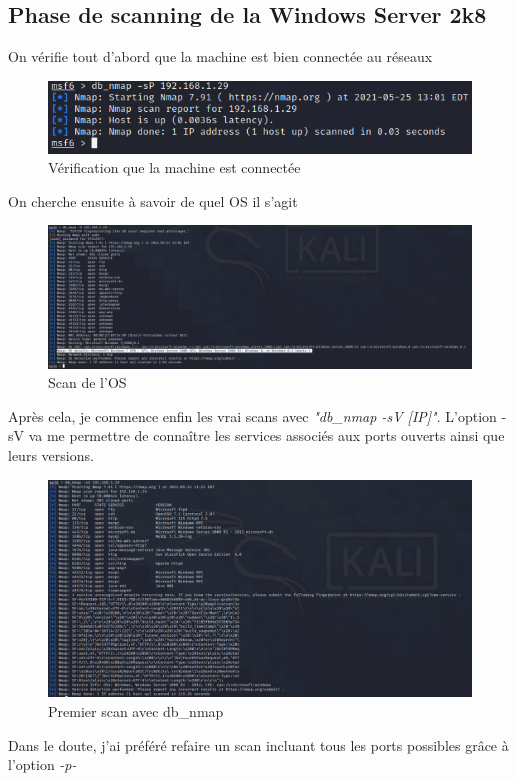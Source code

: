 \documentclass[a4paper]{article}
\begin{document}
\subsection{Phase de scanning de la Windows Server 2k8}
On vérifie tout d'abord que la machine est bien connectée au réseaux
\begin{figure}[H]
  \centering
  \includegraphics[width=12cm]{images/Rapport/kali/W2k8/1.png}
  \caption{Vérification que la machine est connectée}
\end{figure}
On cherche ensuite à savoir de quel OS il s'agit
\begin{figure}[H]
  \centering
  \includegraphics[width=17cm]{images/Rapport/kali/W2k8/2.png}
  \caption{Scan de l'OS}
\end{figure}
Après cela, je commence enfin les vrai scans avec \emph{"db\_nmap -sV [IP]"}. L'option -sV va me permettre de connaître les services associés aux ports ouverts ainsi que leurs versions.
\begin{figure}[H]
  \centering
  \includegraphics[width=16cm]{images/Rapport/kali/W2k8/3.png}
  \caption{Premier scan avec db\_nmap}
\end{figure}
Dans le doute, j'ai préféré refaire un scan incluant tous les ports possibles grâce à l'option \emph{-p-}
\end{document}
